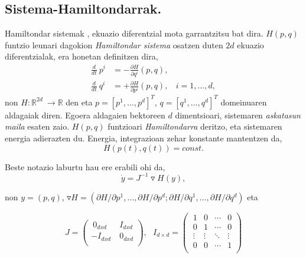  

\subsection{Sistema-Hamiltondarrak.}

 
Hamiltondar sistemak \cite{SSerna2015}, ekuazio diferentzial mota garrantzitsu bat dira. $H(p,q)$ funtzio leunari dagokion \emph{Hamiltondar sistema} osatzen duten $2d$ ekuazio diferentzialak, era honetan definitzen dira,
\begin{align*}
\label{eq:212}
\frac{d}{dt} \ {p}^i & =-\frac{\partial H }{\partial q^i} (p,q), \\
\frac{d}{dt} \ {q}^i & =+\frac{\partial H}{\partial p^i} (p,q), \ \ \ \ i=1,\dots,d,
\end{align*}
non $H: {\mathbb{R}}^{2d} \ \longrightarrow {\mathbb{R}}$  den eta  $p=[p^1, \dots , p^d]^T$, $q=[q^1, \dots , q^d]^T$ domeinuaren aldagaiak diren. Egoera aldagaien bektoreen $d$ dimentsioari, sistemaren \emph{askatasun maila} esaten zaio. $H(p,q)$ funtzioari \emph{Hamiltondarra} deritzo, eta sistemaren energia adierazten du. Energia, integrazioan zehar konstante mantentzen da,
\begin{equation*}
\label{eq:212b}
H(p(t),q(t))=const.
\end{equation*}

Beste notazio laburtu hau ere erabili ohi da,
\begin{equation*}
 \label{eq:213}
\dot{y}=J^{-1}\triangledown H(y),
\end{equation*}

non $y=(p,q)$, $\triangledown H=(\partial H/\partial p^1,\dots,\partial H/\partial p^d; \partial H/\partial q^1,\dots,\partial H/\partial q^d)$ eta

\begin{equation*}
 J=\left(\begin{array}{cc}
   \ 0_{dxd} & \ I_{dxd} \\
    -I_{dxd} & \ 0_{dxd} \\
\end{array}\right), \ \ \ 
I_{d \times d}=\left(\begin{array}{cccc}
   \ 1       & 0      & \cdots & 0 \\
   \ 0       & 1      & \cdots & 0 \\
   \ \vdots  & \vdots & \ddots & \vdots \\
   \ 0       & 0 & \cdots & 1 \\
\end{array}\right)  
\end{equation*}


